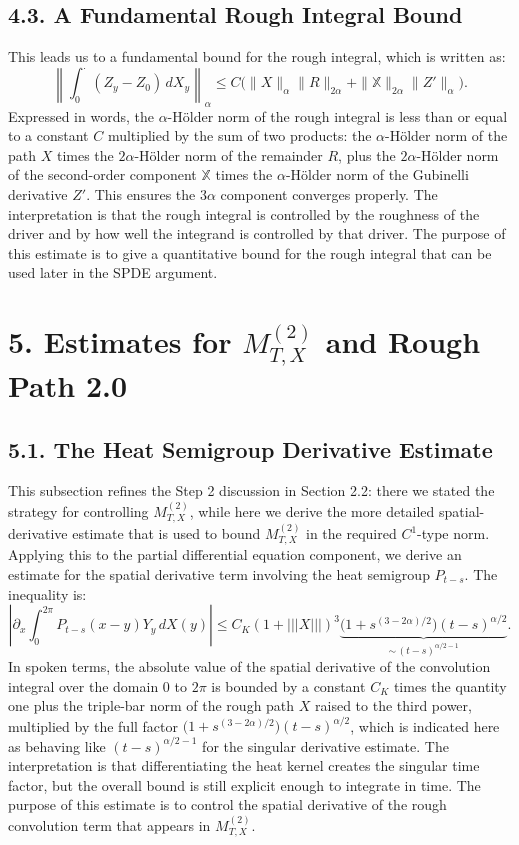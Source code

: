 \documentclass[11pt]{article}
\theoremstyle{definition}
\theoremstyle{remark}
\begin{document}
\subsection*{4.3. A Fundamental Rough Integral Bound}
This leads us to a fundamental bound for the rough integral, which is written as:
\[
\left\|\int_0^\cdot (Z_y-Z_0)\,dX_y\right\|_{\alpha}
\le C\bigl(\|X\|_{\alpha}\|R\|_{2\alpha}+\|\mathbb X\|_{2\alpha}\|Z'\|_{\alpha}\bigr).
\]
Expressed in words, the $\alpha$-H\"older norm of the rough integral is less than or equal to a constant $C$ multiplied by the sum of two products: the $\alpha$-H\"older norm of the path $X$ times the $2\alpha$-H\"older norm of the remainder $R$, plus the $2\alpha$-H\"older norm of the second-order component $\mathbb X$ times the $\alpha$-H\"older norm of the Gubinelli derivative $Z'$. This ensures the $3\alpha$ component converges properly.
The interpretation is that the rough integral is controlled by the roughness of the driver and by how well the integrand is controlled by that driver.
The purpose of this estimate is to give a quantitative bound for the rough integral that can be used later in the SPDE argument.

\section*{5. Estimates for $M_{T,X}^{(2)}$ and Rough Path 2.0}
\subsection*{5.1. The Heat Semigroup Derivative Estimate}
This subsection refines the Step 2 discussion in Section 2.2: there we stated the strategy for controlling $M_{T,X}^{(2)}$, while here we derive the more detailed spatial-derivative estimate that is used to bound $M_{T,X}^{(2)}$ in the required $C^1$-type norm. Applying this to the partial differential equation component, we derive an estimate for the spatial derivative term involving the heat semigroup $P_{t-s}$. The inequality is:
\[
\left|\partial_x\int_0^{2\pi} P_{t-s}(x-y)Y_y\,dX(y)\right|
\le C_K(1+|||X|||)^3\underbrace{\bigl(1+s^{(3-2\alpha)/2}\bigr)(t-s)^{\alpha/2}}_{\sim\,(t-s)^{\alpha/2-1}}.
\]
In spoken terms, the absolute value of the spatial derivative of the convolution integral over the domain $0$ to $2\pi$ is bounded by a constant $C_K$ times the quantity one plus the triple-bar norm of the rough path $X$ raised to the third power, multiplied by the full factor $\bigl(1+s^{(3-2\alpha)/2}\bigr)(t-s)^{\alpha/2}$, which is indicated here as behaving like $(t-s)^{\alpha/2-1}$ for the singular derivative estimate.
The interpretation is that differentiating the heat kernel creates the singular time factor, but the overall bound is still explicit enough to integrate in time.
The purpose of this estimate is to control the spatial derivative of the rough convolution term that appears in $M_{T,X}^{(2)}$.
\end{document}
